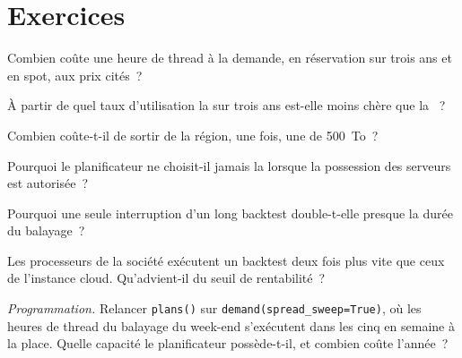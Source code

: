 \section{Exercices}

\begin{exercise}[$\star$]\label{exo:pl:cloud-against-on-premises:1}
Combien coûte une heure de thread à la demande, en réservation sur trois ans et en spot, aux prix cités~?
\end{exercise}

\begin{exercise}[$\star$]\label{exo:pl:cloud-against-on-premises:2}
À partir de quel taux d'utilisation la  sur trois ans est-elle moins chère que la ~?
\end{exercise}

\begin{exercise}[$\star$]\label{exo:pl:cloud-against-on-premises:3}
Combien coûte-t-il de sortir de la région, une fois, une  de 500~To~?
\end{exercise}

\begin{exercise}[$\star\star$]\label{exo:pl:cloud-against-on-premises:4}
Pourquoi le planificateur ne choisit-il jamais la  lorsque la possession des serveurs est autorisée~?
\end{exercise}

\begin{exercise}[$\star\star$]\label{exo:pl:cloud-against-on-premises:5}
Pourquoi une seule interruption d'un long backtest double-t-elle presque la durée du balayage~?
\end{exercise}

\begin{exercise}[$\star\star$]\label{exo:pl:cloud-against-on-premises:6}
Les processeurs de la société exécutent un backtest deux fois plus vite que ceux de l'instance cloud. Qu'advient-il du seuil de rentabilité~?
\end{exercise}

\begin{exercise}[$\star\star\star$]\label{exo:pl:cloud-against-on-premises:7}
\emph{Programmation.} Relancer \texttt{plans()} sur \texttt{demand(spread\_sweep=True)}, où les heures de thread du balayage du week-end s'exécutent dans les cinq
 en semaine à la place. Quelle capacité le planificateur possède-t-il, et combien coûte l'année~?
\end{exercise}

